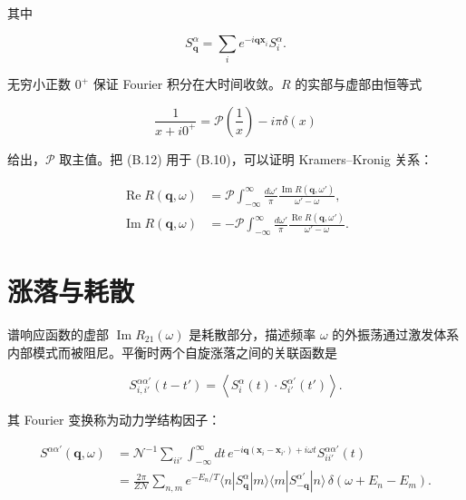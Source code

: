 其中

\begin{equation*}
S _ {\mathbf {q}} ^ {\alpha} = \sum_ {i} e ^ {- i \mathbf {qx} _ {i}} S _ {i} ^ {\alpha}.
\tag{B.11}
\end{equation*}

无穷小正数 $0^{+}$ 保证 Fourier 积分在大时间收敛。$R$ 的实部与虚部由恒等式

\begin{equation*}
\frac {1}{x + i0 ^ {+}} = \mathcal {P} \left( \frac {1}{x} \right) - i \pi \delta ( x )
\tag{B.12}
\end{equation*}

给出，$\mathcal{P}$ 取主值。把 (B.12) 用于 (B.10)，可以证明 Kramers--Kronig 关系：

\begin{align*}
\operatorname{Re} R ( \mathbf {q}, \omega ) & = \mathcal {P} \int_{- \infty} ^ {\infty} \frac {d \omega '}{\pi} \frac {\operatorname{Im} R ( \mathbf {q}, \omega ' )}{\omega ' - \omega} ,\\
\operatorname{Im} R ( \mathbf {q}, \omega ) & = - \mathcal {P} \int_{- \infty} ^ {\infty} \frac {d \omega '}{\pi} \frac {\operatorname{Re} R ( \mathbf {q}, \omega ' )}{\omega ' - \omega} .
\tag{B.13}
\end{align*}

\section{涨落与耗散}

谱响应函数的虚部 $\operatorname{Im} R_{21}(\omega)$ 是耗散部分，描述频率 $\omega$ 的外振荡通过激发体系内部模式而被阻尼。平衡时两个自旋涨落之间的关联函数是

\begin{equation*}
S_{i, i'} ^ {\alpha \alpha'} ( t - t ' ) = \left\langle S _ {i} ^ {\alpha} ( t ) \cdot S _ {i'} ^ {\alpha'} ( t ' ) \right\rangle .
\tag{B.14}
\end{equation*}

其 Fourier 变换称为动力学结构因子：

\begin{align*}
S ^ {\alpha \alpha'} ( \mathbf {q}, \omega ) & = \mathcal {N} ^ {- 1} \sum_{ii'} \int_{- \infty} ^ {\infty} d t \, e ^ {- i \mathbf {q} ( \mathbf {x} _ {i} - \mathbf {x} _ {i'} ) + i\omega t} S_{ii'} ^ {\alpha \alpha'} ( t )\\
& = \frac {2 \pi}{Z \mathcal {N}} \sum_{n, m} e ^ {- E_{n} /T} \langle n | S _ {\mathbf {q}} ^ {\alpha} | m \rangle \langle m | S _ {- \mathbf {q}} ^ {\alpha'} | n \rangle \, \delta \left( \omega + E_{n} - E_{m} \right) .
\tag{B.15}
\end{align*}


